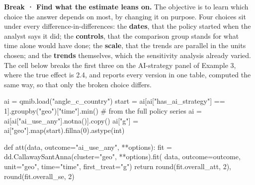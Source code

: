 \documentclass[
  letterpaper,
  10pt,
  twoside,
  openright,
  numbers=noenddot,
  chapterprefix=true]{scrbook}
\newenvironment{Shaded}{}{}
\newcommand{\BuiltInTok}[1]{\textcolor[rgb]{0.84,0.23,0.29}{#1}}
\newcommand{\CommentTok}[1]{\textcolor[rgb]{0.42,0.45,0.49}{#1}}
\newcommand{\ControlFlowTok}[1]{\textcolor[rgb]{0.84,0.23,0.29}{#1}}
\newcommand{\DecValTok}[1]{\textcolor[rgb]{0.00,0.36,0.77}{#1}}
\newcommand{\KeywordTok}[1]{\textcolor[rgb]{0.84,0.23,0.29}{#1}}
\newcommand{\NormalTok}[1]{\textcolor[rgb]{0.14,0.16,0.18}{#1}}
\newcommand{\OperatorTok}[1]{\textcolor[rgb]{0.14,0.16,0.18}{#1}}
\newcommand{\StringTok}[1]{\textcolor[rgb]{0.01,0.18,0.38}{#1}}
\begin{document}
\textbf{Break · Find what the estimate leans on.} The objective is to
learn which choice the answer depends on most, by changing it on
purpose. Four choices sit under every difference-in-differences: the
\textbf{dates}, that the policy started when the analyst says it did;
the \textbf{controls}, that the comparison group stands for what time
alone would have done; the \textbf{scale}, that the trends are parallel
in the units chosen; and the \textbf{trends} themselves, which the
sensitivity analysis already varied. The cell below breaks the first
three on the AI-strategy panel of Example 3, where the true effect is
2.4, and reports every version in one table, computed the same way, so
that only the broken choice differs.

\label{check-break}
\begin{Shaded}
\begin{Highlighting}[]
\NormalTok{ai }\OperatorTok{=}\NormalTok{ qmib.load(}\StringTok{"angle\_c\_country"}\NormalTok{)}
\NormalTok{start }\OperatorTok{=}\NormalTok{ ai[ai[}\StringTok{"has\_ai\_strategy"}\NormalTok{] }\OperatorTok{==} \DecValTok{1}\NormalTok{].groupby(}\StringTok{"geo"}\NormalTok{)[}\StringTok{"time"}\NormalTok{].}\BuiltInTok{min}\NormalTok{()   }\CommentTok{\# from the full policy series}
\NormalTok{ai }\OperatorTok{=}\NormalTok{ ai[ai[}\StringTok{"ai\_use\_any"}\NormalTok{].notna()].copy()}
\NormalTok{ai[}\StringTok{"g"}\NormalTok{] }\OperatorTok{=}\NormalTok{ ai[}\StringTok{"geo"}\NormalTok{].}\BuiltInTok{map}\NormalTok{(start).fillna(}\DecValTok{0}\NormalTok{).astype(}\BuiltInTok{int}\NormalTok{)}

\KeywordTok{def}\NormalTok{ att(data, outcome}\OperatorTok{=}\StringTok{"ai\_use\_any"}\NormalTok{, }\OperatorTok{**}\NormalTok{options):}
\NormalTok{    fit }\OperatorTok{=}\NormalTok{ dd.CallawaySantAnna(cluster}\OperatorTok{=}\StringTok{"geo"}\NormalTok{, }\OperatorTok{**}\NormalTok{options).fit(}
\NormalTok{        data, outcome}\OperatorTok{=}\NormalTok{outcome, unit}\OperatorTok{=}\StringTok{"geo"}\NormalTok{, time}\OperatorTok{=}\StringTok{"time"}\NormalTok{, first\_treat}\OperatorTok{=}\StringTok{"g"}\NormalTok{)}
    \ControlFlowTok{return} \BuiltInTok{round}\NormalTok{(fit.overall\_att, }\DecValTok{2}\NormalTok{), }\BuiltInTok{round}\NormalTok{(fit.overall\_se, }\DecValTok{2}\NormalTok{)}


\end{Highlighting}
\end{Shaded}
\end{document}
